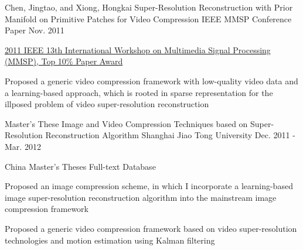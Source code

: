 
\begin{cventries}

  \cventry
    {Chen, Jingtao, and  Xiong, Hongkai} %
    {Super-Resolution Reconstruction with Prior Manifold on Primitive Patches for Video Compression} %
    {IEEE MMSP Conference Paper} %
    {Nov. 2011} %
    {
      \begin{cvitems} %
        \item {\href{http://ieeexplore.ieee.org/abstract/document/6093849/}{2011 IEEE 13th International Workshop on Multimedia Signal Processing (MMSP), Top 10\% Paper Award}}
        \item {Proposed a generic video compression framework with low-quality video data and a learning-based approach, which is rooted in sparse representation for the illposed problem of video super-resolution reconstruction}
      \end{cvitems}
    }

  \cventry
    {Master's These} %
    {Image and Video Compression Techniques based on Super-Resolution Reconstruction Algorithm} %
    {Shanghai Jiao Tong University} %
    {Dec. 2011 - Mar. 2012} %
    {
      \begin{cvitems} %
        \item {China Master’s Theses Full-text Database}
		\item {Proposed an image compression scheme, in which I incorporate a learning-based image super-resolution
reconstruction algorithm into the mainstream image compression framework}
		\item {Proposed a generic video compression framework based on video super-resolution technologies and motion estimation using Kalman filtering}
      \end{cvitems}
    }

\end{cventries}
